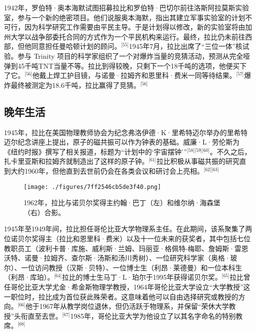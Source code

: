 1942年，罗伯特·奥本海默试图招募拉比和罗伯特·巴切尔前往洛斯阿拉莫斯实验室，参与一个新的绝密项目。他们说服奥本海默，指出其建立军事实验室的计划不可行，因为科学研究工作需要由平民主导。于是计划得以修改，新的实验室将由加州大学以战争部委托合同的方式作为一个平民机构来运行。最终，拉比仍未前往西部，但他同意担任曼哈顿计划的顾问。\(^\text{[55]}\)1945年7月，拉比出席了“三位一体”核试验。参与 Trinity 项目的科学家组织了一个对爆炸当量的竞猜活动，预测从完全哑弹到45千吨TNT当量不等。拉比到得较晚，只剩下一个18千吨的选项，他便买下了它。\(^\text{[56]}\)他戴上焊工护目镜，与诺曼·拉姆齐和恩里科·费米一同等待结果。\(^\text{[57]}\)爆炸最终被测定为18.6千吨，拉比赢得了竞猜。\(^\text{[56]}\)
\subsection{晚年生活}
1945年，拉比在美国物理教师协会为纪念弗洛伊德·K·里希特迈尔举办的里希特迈尔纪念讲座上提出，原子的磁共振可以作为钟表的基础。威廉·L·劳伦斯为《纽约时报》撰写了相关报道，标题为“计划中的‘宇宙摆钟’”\(^\text{[58][59][60]}\)。不久之后，扎卡里亚斯和拉姆齐就制造出了这样的原子钟。\(^\text{[61]}\)拉比积极从事磁共振的研究直到大约1960年，但他直到去世前仍会在各类会议和研讨会上亮相。\(^\text{[62][63]}\)
\begin{figure}[ht]
\centering
\texttt{[image: ./figures/7ff2546cb5de3f40.png]}
\caption{1962年，拉比与诺贝尔奖得主约翰·巴丁（左）和维尔纳·海森堡（右）合影。} \label{fig_YXDlb_5}
\end{figure}
1945年至1949年间，拉比担任哥伦比亚大学物理系主任。在此期间，该系聚集了两位诺贝尔奖得主（拉比和恩里科·费米）以及十一位未来的获奖者，其中包括七位教职员工（波利卡普·库施、威利斯·兰姆、玛丽亚·格佩特-梅耶、詹姆斯·雷恩沃特、诺曼·拉姆齐、查尔斯·汤斯和汤川秀树）、一位研究科学家（奥格·玻尔）、一位访问教授（汉斯·贝特）、一位博士生（利昂·莱德曼）和一位本科生（利昂·库珀）。\(^\text{[64]}\)拉比的博士生马丁·L·珀尔于1995年获得诺贝尔奖。\(^\text{[65]}\)拉比曾任哥伦比亚大学尤金·希金斯物理学教授，1964年哥伦比亚大学设立“大学教授”这一职位时，拉比成为首位获此殊荣者。这意味着他可以自由选择研究或教授的方向。\(^\text{[66]}\)他于1967年从教学岗位退休，但仍活跃于物理系，并保留“荣休大学教授”头衔直至去世。\(^\text{[67]}\)1985年，哥伦比亚大学为他设立了以其名字命名的特别教席。\(^\text{[68]}\)

